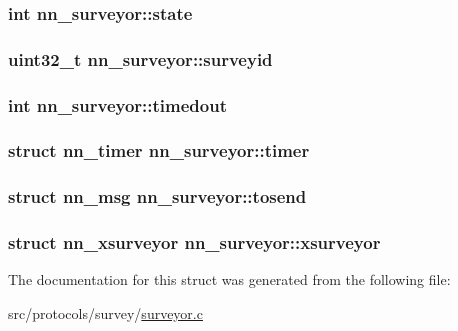 \subsubsection[{state}]{\setlength{\rightskip}{0pt plus 5cm}int nn\+\_\+surveyor\+::state}\hypertarget{structnn__surveyor_affc3200017272d3e32f61e5f580845fd}{}\label{structnn__surveyor_affc3200017272d3e32f61e5f580845fd}
\subsubsection[{surveyid}]{\setlength{\rightskip}{0pt plus 5cm}uint32\+\_\+t nn\+\_\+surveyor\+::surveyid}\hypertarget{structnn__surveyor_a99902f4cd47871c07da694e751ae98aa}{}\label{structnn__surveyor_a99902f4cd47871c07da694e751ae98aa}
\subsubsection[{timedout}]{\setlength{\rightskip}{0pt plus 5cm}int nn\+\_\+surveyor\+::timedout}\hypertarget{structnn__surveyor_a6f966b4fd12270e2a8905a2a71289041}{}\label{structnn__surveyor_a6f966b4fd12270e2a8905a2a71289041}
\subsubsection[{timer}]{\setlength{\rightskip}{0pt plus 5cm}struct {\bf nn\+\_\+timer} nn\+\_\+surveyor\+::timer}\hypertarget{structnn__surveyor_a2a83430636c385e2bc375a0a650d7ba3}{}\label{structnn__surveyor_a2a83430636c385e2bc375a0a650d7ba3}
\subsubsection[{tosend}]{\setlength{\rightskip}{0pt plus 5cm}struct {\bf nn\+\_\+msg} nn\+\_\+surveyor\+::tosend}\hypertarget{structnn__surveyor_ac8ab54591fb9abfa2f854b1357a74edf}{}\label{structnn__surveyor_ac8ab54591fb9abfa2f854b1357a74edf}
\subsubsection[{xsurveyor}]{\setlength{\rightskip}{0pt plus 5cm}struct {\bf nn\+\_\+xsurveyor} nn\+\_\+surveyor\+::xsurveyor}\hypertarget{structnn__surveyor_ab1b13ce4b6625436d5702e25c80d01ee}{}\label{structnn__surveyor_ab1b13ce4b6625436d5702e25c80d01ee}


The documentation for this struct was generated from the following file\+:\begin{DoxyCompactItemize}
\item 
src/protocols/survey/\hyperlink{surveyor_8c}{surveyor.\+c}\end{DoxyCompactItemize}

